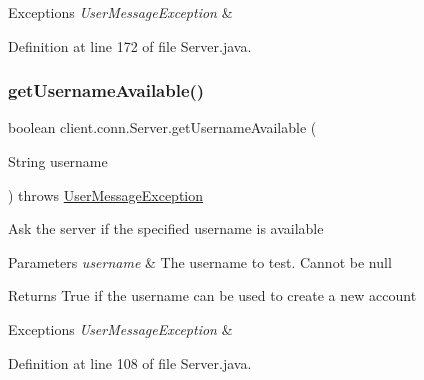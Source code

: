 \begin{DoxyExceptions}{Exceptions}
{\em User\+Message\+Exception} & \\
\hline
\end{DoxyExceptions}


Definition at line 172 of file Server.\+java.

\hypertarget{classclient_1_1conn_1_1_server_ab25d4a9f33372c404d2464d1b608dd77}{}\label{classclient_1_1conn_1_1_server_ab25d4a9f33372c404d2464d1b608dd77} 
\subsubsection{\texorpdfstring{get\+Username\+Available()}{getUsernameAvailable()}}
{\footnotesize\ttfamily boolean client.\+conn.\+Server.\+get\+Username\+Available (\begin{DoxyParamCaption}\item[{String}]{username }\end{DoxyParamCaption}) throws \hyperlink{classpt_1_1up_1_1fe_1_1lpro1613_1_1sharedlib_1_1exceptions_1_1_user_message_exception}{User\+Message\+Exception}}

Ask the server if the specified username is available 
\begin{DoxyParams}{Parameters}
{\em username} & The username to test. Cannot be null \\
\hline
\end{DoxyParams}
\begin{DoxyReturn}{Returns}
True if the username can be used to create a new account 
\end{DoxyReturn}

\begin{DoxyExceptions}{Exceptions}
{\em User\+Message\+Exception} & \\
\hline
\end{DoxyExceptions}


Definition at line 108 of file Server.\+java.

\hypertarget{classclient_1_1conn_1_1_server_a620def50e5115d3798407dfff5433ead}{}\label{classclient_1_1conn_1_1_server_a620def50e5115d3798407dfff5433ead} 

